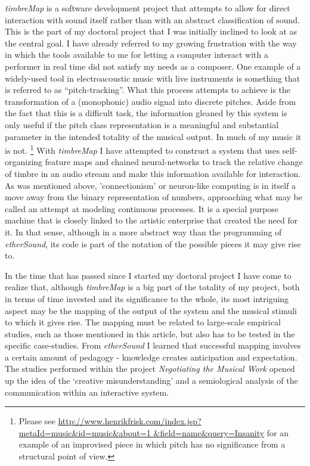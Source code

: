 \emph{timbreMap} is a software development project that attempts to
allow for direct interaction with sound itself rather than with an
abstract classification of sound. This is the part of my doctoral
project that I was initially inclined to look at as the central goal. I
have already referred to my growing frustration with the way in which
the tools available to me for letting a computer interact with a
performer in real time did not satisfy my needs as a composer. One
example of a widely-used tool in electroacoustic music with live
instruments is something that is referred to as ``pitch-tracking''.
What
this process attempts to achieve is the transformation of a (monophonic)
audio signal into discrete pitches. Aside from the fact that this is a
difficult task, the information gleaned by this system is only
useful if the pitch class representation is a meaningful and substantial
parameter in the intended totality of the musical output. In much of my
music it is not.
\footnote{Please see
\url{http://www.henrikfrisk.com/index.jsp?metaId=music&id=music&about=1
&field=name&query=Insanity} for an example of an improvised piece in
which pitch has no significance from a structural point of view.}
With \emph{timbreMap} I have attempted to construct a system that uses
self-organizing feature maps and chained neural-networks to track the
relative change of timbre in an audio stream and make this information
available for interaction. As was mentioned above, 'connectionism' or
neuron-like computing is in itself a move away from the binary
representation of numbers, approaching what may be called an attempt at
modeling continuous processes. It is a special purpose machine that is
closely linked to the artistic enterprise that created the need for
it. In that sense, although in a more abstract way than the programming
of \emph{etherSound}, its code is part of the notation of the possible
pieces it may give rise to.

In the time that has passed since I started my doctoral project I have
come to realize that, although \emph{timbreMap} is a big part of the
totality of my project, both in terms of time invested and its
significance to the whole, its most intriguing aspect may be the mapping
of the output of the system and the musical stimuli to which it gives
rise. The mapping must be related to large-scale empirical studies, such
as those mentioned in this article, but also has to be tested in the
specific case-studies. From \emph{etherSound} I learned that successful
mapping involves a certain amount of pedagogy - knowledge creates
anticipation and expectation. The studies performed within the project
\emph{Negotiating the Musical Work} opened up the idea of the `creative
misunderstanding' and a semiological analysis of the communication
within an interactive system.

